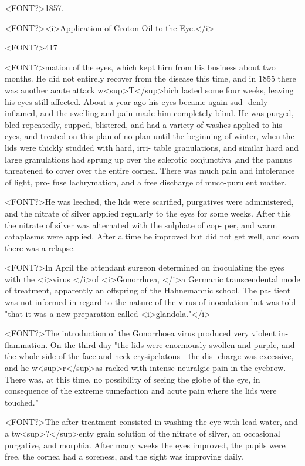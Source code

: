 <FONT?>1857.]

<FONT?><i>Application of Croton Oil to the Eye.</i>

<FONT?>417

<FONT?>mation of the eyes, which kept hirn from his business about two months.
He did not entirely recover from the disease this time, and in 1855
there was another acute attack w<sup>T</sup>hich lasted some four weeks, leaving
his eyes still affected. About a year ago his eyes became again sud-
denly inflamed, and the swelling and pain made him completely blind.
He was purged, bled repeatedly, cupped, blistered, and had a variety of
washes applied to his eyes, and treated on this plan of no plan until the
beginning of winter, when the lids were thickly studded with hard, irri-
table granulations, and similar hard and large granulations had sprung
up over the sclerotic conjunctiva ,and the pannus threatened to cover over
the entire cornea. There was much pain and intolerance of light, pro-
fuse lachrymation, and a free discharge of muco-purulent matter.

<FONT?>He was leeched, the lids were scarified, purgatives were administered,
and the nitrate of silver applied regularly to the eyes for some weeks.
After this the nitrate of silver was alternated with the sulphate of cop-
per, and warm cataplasms were applied. After a time he improved
but did not get well, and soon there was a relapse.

<FONT?>In April the attendant surgeon determined on inoculating the eyes
with the <i>virus </i>of <i>Gonorrhœa, </i>a Germanic transcendental mode of
treatment, apparently an offspring of the Hahnemannic school. The pa-
tient was not informed in regard to the nature of the virus of inoculation
but was told "that it was a new preparation called <i>glandola."</i>

<FONT?>The introduction of the Gonorrhoea virus produced very violent in-
flammation. On the third day "the lids were enormously swollen and
purple, and the whole side of the face and neck erysipelatous---the dis-
charge was excessive, and he w<sup>r</sup>as racked with intense neuralgic pain in
the eyebrow. There was, at this time, no possibility of seeing the globe of
the eye, in consequence of the extreme tumefaction and acute pain
where the lids were touched."

<FONT?>The after treatment consisted in washing the eye with lead water, and
a tw<sup>?</sup>enty grain solution of the nitrate of silver, an occasional purgative,
and morphia. After many weeks the eyes improved, the pupils were
free, the cornea had a soreness, and the sight was improving daily.

